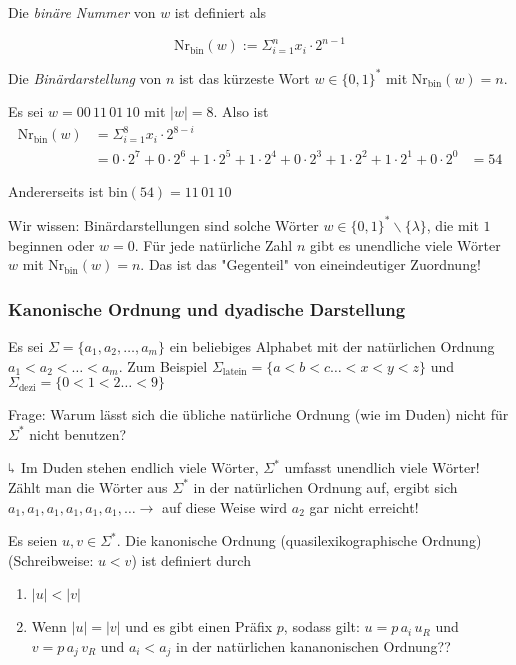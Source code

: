 \documentclass[runningheads,deutsch]{llncs}
\begin{document}
Die \textit{binäre Nummer} von $w$ ist definiert als

\[ \text{Nr}_\text{bin}(w) := \Sigma^n_{i=1} x_i \cdot 2^{n-1} \]

Die \textit{Binärdarstellung} von $n$ ist das kürzeste Wort $w \in \{0, 1\}^*$ mit $\text{Nr}_\text{bin}(w) = n$.

\begin{example}
    Es sei $w = 00\, 11\, 01\, 10$ mit $|w| = 8$. Also ist 
    \begin{align*}
        \text{Nr}_\text{bin}(w) &= \Sigma^8_{i=1} x_i \cdot 2^{8-i} \\
        &= 0 \cdot 2^7 + 0 \cdot 2^6 + 1 \cdot 2^5 + 1 \cdot 2^4 + 0 \cdot 2^3 + 1 \cdot 2^2 + 1 \cdot 2^1 + 0 \cdot 2^0
        &= 54
    \end{align*}

    Andererseits ist $\text{bin}(54) = 11\, 01\, 10$
\end{example}

Wir wissen: Binärdarstellungen sind solche Wörter $w\in \{ 0,1 \}^* \backslash \{\lambda\}$, die mit $1$ beginnen oder $w=0$. Für jede natürliche Zahl $n$ gibt es unendliche viele Wörter $w$ mit $\text{Nr}_{\text{bin}}(w) = n$. Das ist das "Gegenteil" von eineindeutiger Zuordnung!

\subsubsection{Kanonische Ordnung und dyadische Darstellung}

Es sei $\Sigma = \{ a_1, a_2, \dots, a_m \}$ ein beliebiges Alphabet mit der natürlichen Ordnung $a_1 < a_2 < \dots < a_m$. Zum Beispiel $\Sigma_{\text{latein}} = \{a < b < c \dots < x < y < z\}$ und $\Sigma_{\text{dezi}} = \{0 < 1 < 2 \dots < 9\}$

Frage: Warum lässt sich die übliche natürliche Ordnung (wie im Duden) nicht für $\Sigma^*$ nicht benutzen?

$\rotatebox[origin=c]{180}{$\Lsh$}$ Im Duden stehen endlich viele Wörter, $\Sigma^*$ umfasst unendlich viele Wörter! Zählt man die Wörter aus $\Sigma^*$ in der natürlichen Ordnung auf, ergibt sich $a_1, a_1, a_1, a_1, a_1, a_1, \dots \rightarrow$ auf diese Weise wird $a_2$ gar nicht erreicht!

\begin{definition}
    Es seien $u, v \in \Sigma^*$. Die kanonische Ordnung (quasilexikographische Ordnung) (Schreibweise: $u < v$) ist definiert durch
    \begin{enumerate}
        \item $|u| < |v|$
        \item Wenn $|u| = |v|$ und es gibt einen Präfix $p$, sodass gilt: $u = p\, a_i\, u_R$ und $v = p\, a_j\, v_R$ und $a_i < a_j$ in der natürlichen kananonischen Ordnung??
    \end{enumerate}
\end{definition}
\end{document}
